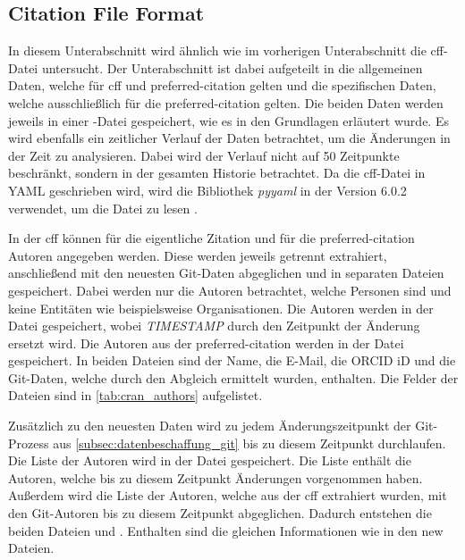 \subsection{Citation File Format}
\label{subsec:datenbeschaffung_cff}
In diesem Unterabschnitt wird ähnlich wie im vorherigen Unterabschnitt die \gls{cff}-Datei untersucht.
Der Unterabschnitt ist dabei aufgeteilt in die allgemeinen Daten, welche für \gls{cff} und \grqq preferred-citation\glqq{} gelten und die spezifischen Daten, welche ausschließlich für die \grqq preferred-citation\glqq{} gelten.
Die beiden Daten werden jeweils in einer -Datei gespeichert, wie es in den Grundlagen erläutert wurde.
Es wird ebenfalls ein zeitlicher Verlauf der Daten betrachtet, um die Änderungen in der Zeit zu analysieren.
Dabei wird der Verlauf nicht auf 50 Zeitpunkte beschränkt, sondern in der gesamten Historie betrachtet.
Da die \gls{cff}-Datei in YAML geschrieben wird, wird die Bibliothek \emph{pyyaml} in der Version 6.0.2 verwendet, um die Datei zu lesen \autocite{noauthor_yamlpyyaml_2024}.

In der \gls{cff} können für die eigentliche Zitation und für die \grqq preferred-citation\glqq{} Autoren angegeben werden.
Diese werden jeweils getrennt extrahiert, anschließend mit den neuesten Git-Daten abgeglichen und in separaten Dateien gespeichert.
Dabei werden nur die Autoren betrachtet, welche Personen sind und keine Entitäten wie beispielsweise Organisationen.
Die Autoren werden in der Datei  gespeichert, wobei \emph{TIMESTAMP} durch den Zeitpunkt der Änderung ersetzt wird.
Die Autoren aus der \grqq preferred-citation\glqq{} werden in der Datei  gespeichert.
In beiden Dateien sind der Name, die E-Mail, die ORCID iD und die Git-Daten, welche durch den Abgleich ermittelt wurden, enthalten.
Die Felder der Dateien sind in \autoref{tab:cran_authors} aufgelistet.

Zusätzlich zu den neuesten Daten wird zu jedem Änderungszeitpunkt der Git-Prozess aus \autoref{subsec:datenbeschaffung_git} bis zu diesem Zeitpunkt durchlaufen.
Die Liste der Autoren wird in der Datei  gespeichert.
Die Liste enthält die Autoren, welche bis zu diesem Zeitpunkt Änderungen vorgenommen haben.
Außerdem wird die Liste der Autoren, welche aus der \gls{cff} extrahiert wurden, mit den Git-Autoren bis zu diesem Zeitpunkt abgeglichen.
Dadurch entstehen die beiden Dateien  und .
Enthalten sind die gleichen Informationen wie in den \glqq new\grqq{} Dateien.

